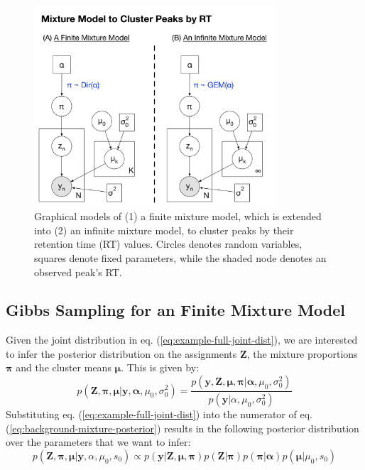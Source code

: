 \begin{figure}[tbh!]
\noindent \begin{centering}
\includegraphics[width=0.8\textwidth]{03-machine-learning/figures/mixture_model.pdf}
\par\end{centering}
\caption{\label{fig:background-mixture-plate-diagram}Graphical models of (1) a finite mixture model, which is extended into (2) an infinite mixture model, to cluster peaks by their retention time (RT) values. Circles denotes random variables, squares denote fixed parameters, while the shaded node denotes an observed peak's RT.}
\end{figure}

\subsection{Gibbs Sampling for an Finite Mixture Model}

Given the joint distribution in eq. (\ref{eq:example-full-joint-dist}), we are interested to infer the posterior distribution on the assignments $\boldsymbol{Z}$, the mixture proportions $\boldsymbol{\pi}$ and the cluster means $\boldsymbol{\mu}$. This is given by:
\begin{equation}
p(\boldsymbol{Z},\boldsymbol{\pi},\boldsymbol{\mu} \vert \boldsymbol{y}, \boldsymbol{\alpha},\mu_0,\sigma_0^2) = \frac{p(\boldsymbol{y}, \boldsymbol{Z}, \boldsymbol{\mu},\boldsymbol{\pi} \vert \boldsymbol{\alpha},\mu_0,\sigma_0^2)}{p(\boldsymbol{y} \vert \alpha,\mu_0,\sigma_0^2)}
\label{eq:background-mixture-posterior}
\end{equation}
Substituting eq. (\ref{eq:example-full-joint-dist}) into the numerator of eq. (\ref{eq:background-mixture-posterior}) results in the following posterior distribution over the parameters that we want to infer:
\begin{equation}
p(\boldsymbol{Z},\boldsymbol{\pi},\boldsymbol{\mu} \vert \boldsymbol{y},\alpha,\mu_0,s_0) \propto p(\boldsymbol{y} \vert \boldsymbol{Z}, \boldsymbol{\mu},\boldsymbol{\pi}) p(\boldsymbol{Z} \vert \boldsymbol{\pi}) p(\boldsymbol{\pi} \vert \boldsymbol{\alpha}) p(\boldsymbol{\mu} \vert \mu_0, s_0)
\label{eq:background-mixture-expanded-posterior}
\end{equation}

